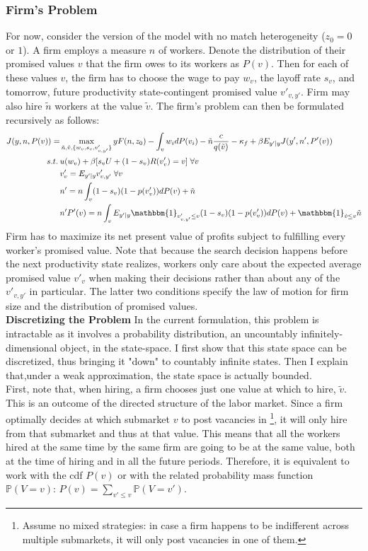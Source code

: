 \subsubsection*{Firm's Problem}
For now, consider the version of the model with no match heterogeneity ($z_0=0$ or $1$). A firm employs a measure $n$ of workers. Denote the distribution of their promised values $v$ that the firm owes to its workers as $P(v)$. Then for each of these values $v$, the firm has to choose the wage to pay $w_v$, the layoff rate $s_v$, and tomorrow, future productivity state-contingent promised value $v'_{v,y'}$. Firm may also hire $\tilde{n}$ workers at the value $\tilde{v}$.
The firm's problem can then be formulated recursively as follows:
\begin{equation*}
    \begin{split}
    J(y,n,P(v)) = & \max_{\tilde{n},\tilde{v},\{w_v,s_v,v'_{v,y'}\}} yF(n,z_0) - \int_v w_i dP(v_i) -\tilde{n}\frac{c}{q(\tilde{v})} -\kappa_f+ \beta E_{y'|y} J(y',n',P'(v)) \\
     s.t. \: & u(w_v) + \beta [s_v U + (1-s_v)R(v'_{v})=v] \; \forall v \\
    & v'_v = E_{y'|y} v'_{v,y'} \; \forall v \\
    & n' = n\int_v (1-s_v)(1-p(v'_v))dP(v)+\tilde{n} \\
    & n'P'(v) = n\int_v E_{y'|y}\mathbbm{1}_{v'_{v,y'}\leq v} (1-s_v)(1-p(v'_v))dP(v)+\mathbbm{1}_{\tilde{v}\leq v}\tilde{n}
    \end{split}
\end{equation*}
Firm has to maximize its net present value of profits subject to fulfilling every worker's promised value. 
Note that because the search decision happens before the next productivity state realizes, workers only care about the expected average promised value $v'_v$ when making their decisions rather than about any of the $v'_{v,y'}$ in particular. The latter two conditions specify the law of motion for firm size and the distribution of promised values. \\
\textbf{Discretizing the Problem}  In the current formulation, this problem is intractable as it involves a probability distribution, an uncountably infinitely-dimensional object, in the state-space. I first show that this state space can be discretized, thus bringing it "down" to countably infinite states. Then I explain that,under a weak approximation, the state space is actually bounded. \\
First, note that, when hiring, a firm chooses just one value at which to hire, $\tilde{v}$. This is an outcome of the directed structure of the labor market. Since a firm optimally decides at which submarket $v$ to post vacancies in \footnote{Assume no mixed strategies: in case a firm happens to be indifferent across multiple submarkets, it will only post vacancies in one of them.}, it will only hire from that submarket and thus at that value. This means that all the workers hired at the same time by the same firm are going to be at the same value, both at the time of hiring and in all the future periods. Therefore, it is equivalent to work with the cdf $P(v)$ or with the related probability mass function $\mathbb{P}(V=v)$: $P(v)=\sum_{v'\leq v}\mathbb{P}(V=v')$. 
